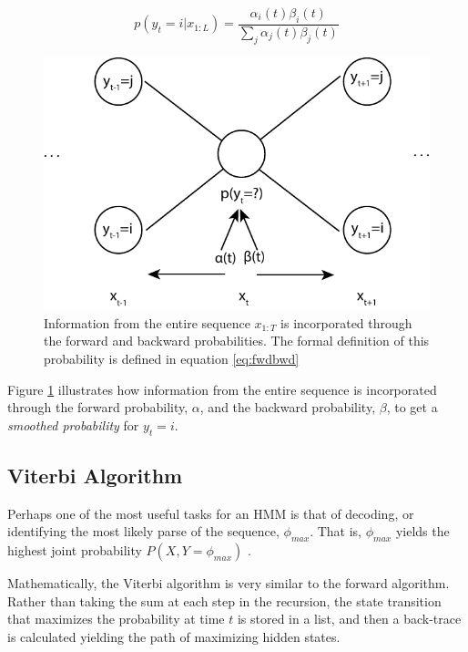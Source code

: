 \begin{equation}
p(y_t=i|x_{1:L}) = \frac{\alpha_i(t)\beta_i(t)}{\sum_j{\alpha_j(t)\beta_j(t)}}
\label{eq:fwdbwd}
\end{equation}

\begin{figure}[t]
\centering
\includegraphics[width=\textwidth]{images/fwdbwd.pdf}
\caption{Information from the entire sequence $x_{1:T}$ is incorporated through the forward and backward probabilities. The formal definition of this probability is defined in equation \ref{eq:fwdbwd}}
\label{fig:fwdbwd}
\end{figure}

Figure \ref{fig:fwdbwd} illustrates how information from the entire sequence is incorporated through the forward probability, $\alpha$, and the backward probability, $\beta$, to get a \emph{smoothed probability} for $y_t = i$.

\subsection{Viterbi Algorithm}
Perhaps one of the most useful tasks for an HMM is that of decoding, or identifying the most likely parse of the sequence, $\phi_{max}$. That is, $\phi_{max}$ yields the highest joint probability $P(X,Y=\phi_{max})$ \cite{Rabiner1989ARecognition}. 

Mathematically, the Viterbi algorithm is very similar to the forward algorithm. Rather than taking the sum at each step in the recursion, the state transition that maximizes the probability at time $t$ is stored in a list, and then a back-trace is calculated yielding the path of maximizing hidden states.

